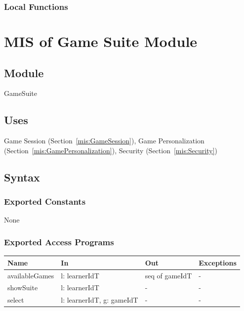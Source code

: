 \documentclass[12pt, titlepage]{article}
\newcommand{\Mref}[1]{Section~\ref{#1}}
\begin{document}
\subsubsection{Local Functions}

\newpage

\section{MIS of Game Suite Module} \label{mis:GameSuite}

\subsection{Module}

GameSuite

\subsection{Uses}

Game Session (\Mref{mis:GameSession}), Game Personalization
(\Mref{mis:GamePersonalization}), Security
(\Mref{mis:Security})

\subsection{Syntax}

\subsubsection{Exported Constants}

None

\subsubsection{Exported Access Programs}

\begin{center}
\small
\begin{tabular}{p{3.3cm} p{4.7cm} p{2.6cm} p{2.8cm}}
\hline
\textbf{Name} & \textbf{In} & \textbf{Out} & \textbf{Exceptions} \\
\hline
availableGames & l: learnerIdT & seq of gameIdT & - \\
showSuite & l: learnerIdT & - & - \\
select & l: learnerIdT, g: gameIdT & - & - \\
\hline
\end{tabular}
\end{center}
\end{document}
